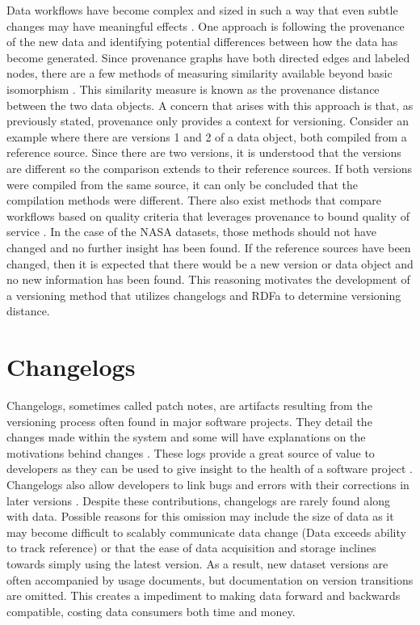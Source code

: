 Data workflows have become complex and sized in such a way that even subtle changes may have meaningful effects \cite{TILMES2011548}.
One approach is following the provenance of the new data and identifying potential differences between how the data has become generated.
Since provenance graphs have both directed edges and labeled nodes, there are a few methods of measuring similarity available beyond basic isomorphism \cite{Cao2013} \cite{Gao2010} \cite{Goddard:1996:DGU:246962.246972} .
This similarity measure is known as the provenance distance between the two data objects.
A concern that arises with this approach is that, as previously stated, provenance only provides a context for versioning.
Consider an example where there are versions 1 and 2 of a data object, both compiled from a reference source.
Since there are two versions, it is understood that the versions are different so the comparison extends to their reference sources.
If both versions were compiled from the same source, it can only be concluded that the compilation methods were different.
There also exist methods that compare workflows based on quality criteria that leverages provenance to bound quality of service \cite{2015:CAA:2778374.2778504}.
In the case of the NASA datasets, those methods should not have changed and no further insight has been found.
If the reference sources have been changed, then it is expected that there would be a new version or data object and no new information has been found.
This reasoning motivates the development of a versioning method that utilizes changelogs and RDFa to determine versioning distance.

\section{Changelogs}

Changelogs, sometimes called patch notes, are artifacts resulting from the versioning process often found in major software projects.
They detail the changes made within the system and some will have explanations on the motivations behind changes \cite{uel1037}.
These logs provide a great source of value to developers as they can be used to give insight to the health of a software project \cite{German03automatingthe} \cite{6132954}.
Changelogs also allow developers to link bugs and errors with their corrections in later versions \cite{Chen:2004:OCL:990374.990391}.
Despite these contributions, changelogs are rarely found along with data.
Possible reasons for this omission may include the size of data  as it may become difficult to scalably communicate data change (Data exceeds ability to track reference) or that the ease of data acquisition and storage inclines towards simply using the latest version.
As a result, new dataset versions are often accompanied by usage documents, but documentation on version transitions are omitted.
This creates a impediment to making data forward and backwards compatible, costing data consumers both time and money.

